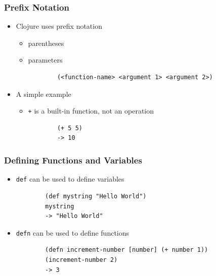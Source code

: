 \documentclass{beamer}
\begin{document}
\begin{frame}[fragile]
\frametitle{Prefix Notation}
	\begin{itemize}
  	 \item Clojure uses prefix notation
  	 \begin{itemize}
  	 	\item parentheses
  	 	\item parameters
  	 \begin{verbatim}
		(<function-name> <argument 1> <argument 2>)
	 \end{verbatim}
	 \end{itemize}
	\end{itemize}
	\begin{itemize}
  	 	\item A simple example
  	 	\begin{itemize}
  	 	 \item \texttt{+} is a built-in function, not an operation
  	 	\begin{verbatim}		
		(+ 5 5)
		-> 10
	    \end{verbatim}
	    \end{itemize}
  	 \end{itemize}
\end{frame}

\begin{frame}[fragile]
\frametitle{Defining Functions and Variables}
	\begin{itemize}
  	 \item \texttt{def} can be used to define variables
  	 \begin{verbatim}
		(def mystring "Hello World")
		mystring
		-> "Hello World"
	\end{verbatim}
	\end{itemize}
	\begin{itemize}
  	 \item \texttt{defn} can be used to define functions
  	 \begin{verbatim}
		(defn increment-number [number] (+ number 1))
		(increment-number 2)
		-> 3
	\end{verbatim}
	\end{itemize}
\end{frame}
\end{document}
